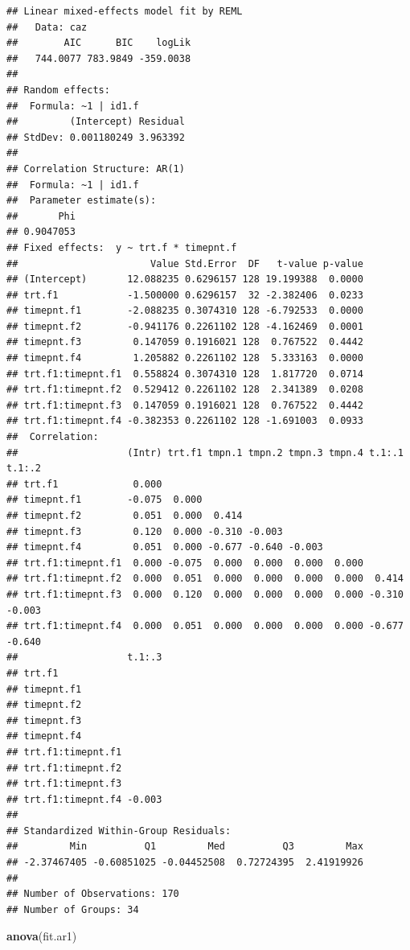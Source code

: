 \documentclass[
]{book}
\newenvironment{Shaded}{\begin{snugshade}}{\end{snugshade}}
\newcommand{\FunctionTok}[1]{\textcolor[rgb]{0.13,0.29,0.53}{\textbf{#1}}}
\newcommand{\NormalTok}[1]{#1}
\begin{document}
\begin{verbatim}
## Linear mixed-effects model fit by REML
##   Data: caz 
##        AIC      BIC    logLik
##   744.0077 783.9849 -359.0038
## 
## Random effects:
##  Formula: ~1 | id1.f
##         (Intercept) Residual
## StdDev: 0.001180249 3.963392
## 
## Correlation Structure: AR(1)
##  Formula: ~1 | id1.f 
##  Parameter estimate(s):
##       Phi 
## 0.9047053 
## Fixed effects:  y ~ trt.f * timepnt.f 
##                       Value Std.Error  DF   t-value p-value
## (Intercept)       12.088235 0.6296157 128 19.199388  0.0000
## trt.f1            -1.500000 0.6296157  32 -2.382406  0.0233
## timepnt.f1        -2.088235 0.3074310 128 -6.792533  0.0000
## timepnt.f2        -0.941176 0.2261102 128 -4.162469  0.0001
## timepnt.f3         0.147059 0.1916021 128  0.767522  0.4442
## timepnt.f4         1.205882 0.2261102 128  5.333163  0.0000
## trt.f1:timepnt.f1  0.558824 0.3074310 128  1.817720  0.0714
## trt.f1:timepnt.f2  0.529412 0.2261102 128  2.341389  0.0208
## trt.f1:timepnt.f3  0.147059 0.1916021 128  0.767522  0.4442
## trt.f1:timepnt.f4 -0.382353 0.2261102 128 -1.691003  0.0933
##  Correlation: 
##                   (Intr) trt.f1 tmpn.1 tmpn.2 tmpn.3 tmpn.4 t.1:.1 t.1:.2
## trt.f1             0.000                                                 
## timepnt.f1        -0.075  0.000                                          
## timepnt.f2         0.051  0.000  0.414                                   
## timepnt.f3         0.120  0.000 -0.310 -0.003                            
## timepnt.f4         0.051  0.000 -0.677 -0.640 -0.003                     
## trt.f1:timepnt.f1  0.000 -0.075  0.000  0.000  0.000  0.000              
## trt.f1:timepnt.f2  0.000  0.051  0.000  0.000  0.000  0.000  0.414       
## trt.f1:timepnt.f3  0.000  0.120  0.000  0.000  0.000  0.000 -0.310 -0.003
## trt.f1:timepnt.f4  0.000  0.051  0.000  0.000  0.000  0.000 -0.677 -0.640
##                   t.1:.3
## trt.f1                  
## timepnt.f1              
## timepnt.f2              
## timepnt.f3              
## timepnt.f4              
## trt.f1:timepnt.f1       
## trt.f1:timepnt.f2       
## trt.f1:timepnt.f3       
## trt.f1:timepnt.f4 -0.003
## 
## Standardized Within-Group Residuals:
##         Min          Q1         Med          Q3         Max 
## -2.37467405 -0.60851025 -0.04452508  0.72724395  2.41919926 
## 
## Number of Observations: 170
## Number of Groups: 34
\end{verbatim}

\begin{Shaded}
\begin{Highlighting}[]
\FunctionTok{anova}\NormalTok{(fit.ar1)}
\end{Highlighting}
\end{Shaded}
\end{document}

